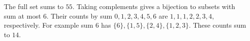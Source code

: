The full set sums to $55$. Taking complements gives a bijection to subsets with sum at most $6$. Their counts by sum $0,1,2,3,4,5,6$ are $1,1,1,2,2,3,4$, respectively. For example sum $6$ has $\{6\},\{1,5\},\{2,4\},\{1,2,3\}$. These counts sum to $\boxed{14}$.
